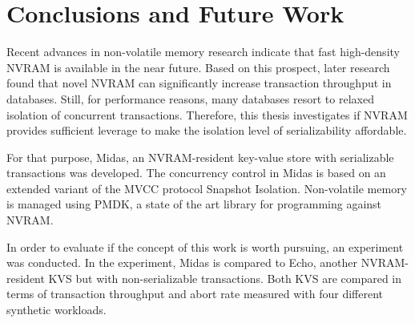 \chapter{Conclusions and Future Work}
\label{ch:summary}

Recent advances in non-volatile memory research indicate that fast high-density
NVRAM is available in the near future. Based on this prospect, later research
found that novel NVRAM can significantly increase transaction throughput in
databases. Still, for performance reasons, many databases resort to relaxed
isolation of concurrent transactions. Therefore, this thesis investigates if
NVRAM provides sufficient leverage to make the isolation level of
serializability affordable.

For that purpose, Midas, an NVRAM-resident key-value store with serializable
transactions was developed. The concurrency control  in Midas is based on an
extended variant of the MVCC protocol Snapshot Isolation. Non-volatile memory is
managed using PMDK, a state of the art library for programming against NVRAM.

In order to evaluate if the concept of this work is worth pursuing, an
experiment was conducted. In the experiment, Midas is compared to Echo, another
NVRAM-resident KVS but with non-serializable transactions. Both KVS are compared
in terms of transaction throughput and abort rate measured with four different
synthetic workloads.


%
